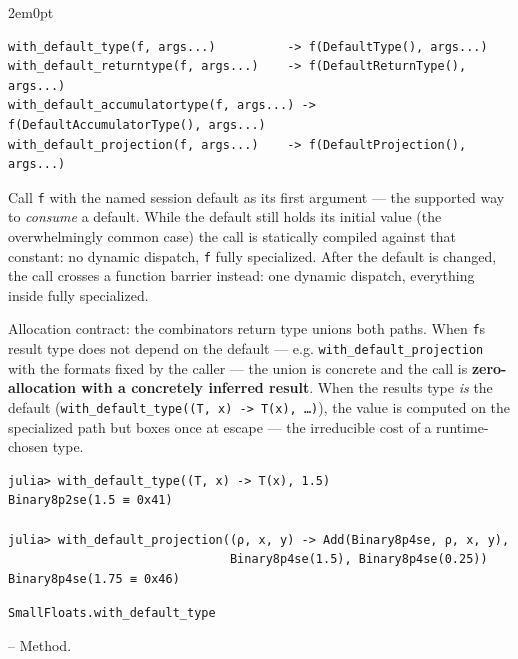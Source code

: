 \begin{adjustwidth}{2em}{0pt}


\begin{verbatim}
with_default_type(f, args...)          -> f(DefaultType(), args...)
with_default_returntype(f, args...)    -> f(DefaultReturnType(), args...)
with_default_accumulatortype(f, args...) -> f(DefaultAccumulatorType(), args...)
with_default_projection(f, args...)    -> f(DefaultProjection(), args...)
\end{verbatim}

Call \texttt{f} with the named session default as its first argument — the supported way to \emph{consume} a default. While the default still holds its initial value (the overwhelmingly common case) the call is statically compiled against that constant: no dynamic dispatch, \texttt{f} fully specialized. After the default is changed, the call crosses a function barrier instead: one dynamic dispatch, everything inside fully specialized.

Allocation contract: the combinator{\textquotesingle}s return type unions both paths. When \texttt{f}{\textquotesingle}s result type does not depend on the default — e.g. \texttt{with\_default\_projection} with the formats fixed by the caller — the union is concrete and the call is \textbf{zero-allocation with a concretely inferred result}. When the result{\textquotesingle}s type \emph{is} the default (\texttt{with\_default\_type((T, x) -> T(x), …)}), the value is computed on the specialized path but boxes once at escape — the irreducible cost of a runtime-chosen type.


\begin{verbatim}
julia> with_default_type((T, x) -> T(x), 1.5)
Binary8p2se(1.5 ≡ 0x41)

julia> with_default_projection((ρ, x, y) -> Add(Binary8p4se, ρ, x, y),
                               Binary8p4se(1.5), Binary8p4se(0.25))
Binary8p4se(1.75 ≡ 0x46)
\end{verbatim}



\end{adjustwidth}
\hypertarget{7019104179409499666}{\texttt{SmallFloats.with\_default\_type}}  -- {Method.}

